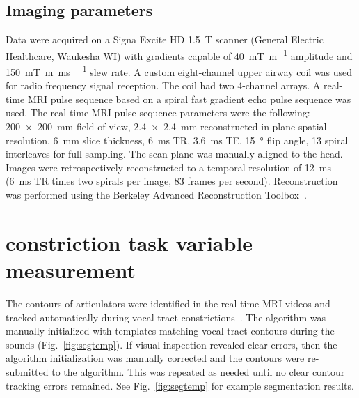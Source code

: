 \documentclass[reprint]{JASAnew}\usepackage[]{graphicx}\usepackage[]{color}
\begin{document}
\subsection{Imaging parameters}

Data were acquired on a Signa Excite HD \SI{1.5}{\tesla} scanner (General Electric Healthcare, Waukesha WI) with gradients capable of \SI[per-mode=symbol]{40}{\milli\tesla\per\meter} amplitude and \SI[per-mode=repeated-symbol]{150}{\milli\tesla\per\meter\per\milli\second} slew rate. A custom eight-channel upper airway coil was used for radio frequency signal reception. The coil had two 4-channel arrays. 
%
A real-time MRI pulse sequence based on a spiral fast gradient echo pulse sequence was used. 
%
The real-time MRI pulse sequence parameters were the following: 
%
\SI{200 x 200}{\milli\meter} field of view, 
\SI{2.4 x 2.4}{\milli\meter} reconstructed in-plane spatial resolution, 
\SI{6}{\milli\meter} slice thickness,
\SI{6}{\milli\second} TR,
\SI{3.6}{\milli\second} TE,
\SI{15}{\degree} flip angle,
\num{13} spiral interleaves for full sampling.
%
The scan plane was manually aligned to the head. 
%
Images were retrospectively reconstructed to a temporal resolution of \SI{12}{\milli\second} (\SI{6}{\milli\second} TR times two spirals per image, 83 frames per second). 
%
Reconstruction was performed using the Berkeley Advanced Reconstruction Toolbox~\citep{uecker2015berkeley}.







\section{constriction task variable measurement}
\label{sec:cd}

The contours of articulators were identified in the real-time MRI videos and tracked automatically during vocal tract constrictions~\citep{bresch2009region}. The algorithm was manually initialized with templates matching vocal tract contours during the sounds \textipa{[a], [j], [p], [t], [k]} (Fig.~\ref{fig:segtemp}). 
%
If visual inspection revealed clear errors, then the algorithm initialization was manually corrected and the contours were re-submitted to the algorithm. This was repeated as needed until no clear contour tracking errors remained. 
%
See Fig.~\ref{fig:segtemp} for example segmentation results.
\end{document}
